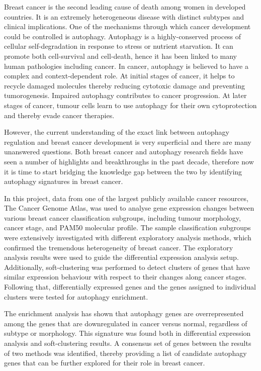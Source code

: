 Breast cancer is the second leading cause of death among women in developed countries. It is an extremely heterogeneous disease with distinct subtypes and clinical implications. One of the mechanisms through which cancer development could be controlled is autophagy. Autophagy is a highly-conserved process of cellular self-degradation in response to stress or nutrient starvation. It can promote both cell-survival and cell-death, hence it has been linked to many human pathologies including cancer. In cancer, autophagy is believed to have a complex and context-dependent role. At initial stages of cancer, it helps to recycle damaged molecules thereby reducing cytotoxic damage and preventing tumorogenesis. Impaired autophagy contributes to cancer progression. At later stages of cancer, tumour cells learn to use autophagy for their own cytoprotection and thereby evade cancer therapies. 

However, the current understanding of the exact link between autophagy regulation and breast cancer development is very superficial and there are many unanswered questions. Both breast cancer and autophagy research fields have seen a number of highlights and breakthroughs in the past decade, therefore now it is time to start bridging the knowledge gap between the two by identifying autophagy signatures in breast cancer. 

In this project, data from one of the largest publicly available cancer resources, The Cancer Genome Atlas, was used to analyse gene expression changes between various breast cancer classification subgroups, including tumour morphology, cancer stage, and PAM50 molecular profile. The sample classification subgroups were extensively investigated with different exploratory analysis methods, which confirmed the tremendous heterogeneity of breast cancer. The exploratory analysis results were used to guide the differential expression analysis setup. Additionally, soft-clustering was performed to detect clusters of genes that have similar expression behaviour with respect to their changes along cancer stages. Following that, differentially expressed genes and the genes assigned to individual clusters were tested for autophagy enrichment. 

The enrichment analysis has shown that autophagy genes are overrepresented among the genes that are downregulated in cancer versus normal, regardless of subtype or morphology. This signature was found both in differential expression analysis and soft-clustering results. A consensus set of genes between the results of two methods was identified, thereby providing a list of candidate autophagy genes that can be further explored for their role in breast cancer. 
